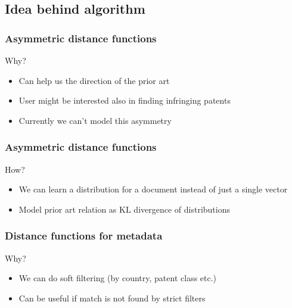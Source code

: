 \documentclass{beamer}
\begin{document}
\subsection{Idea behind algorithm}
  \begin{frame}
    \frametitle{Asymmetric distance functions}  
    \Large Why?
   	\begin{itemize}
		\item Can help us the direction of the prior art
		\item User might be interested also in finding infringing patents
		\item Currently we can't model this asymmetry
	\end{itemize}   
  \end{frame}

  \begin{frame}
    \frametitle{Asymmetric distance functions}  
    \Large How?
   	\begin{itemize}
		\item We can learn a distribution for a document instead of just a single vector
		\item Model prior art relation as KL divergence of distributions
	\end{itemize}   
  \end{frame}

  \begin{frame}
    \frametitle{Distance functions for metadata}  
    \Large Why?
   	\begin{itemize}
		\item We can do soft filtering (by country, patent class etc.)
		\item Can be useful if match is not found by strict filters
	\end{itemize}   
  \end{frame}
\end{document}

